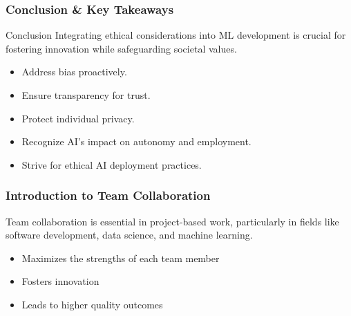 \documentclass[aspectratio=169]{beamer}
\begin{document}
\begin{frame}[fragile]
    \frametitle{Conclusion \& Key Takeaways}
    \begin{block}{Conclusion}
        Integrating ethical considerations into ML development is crucial for fostering innovation while safeguarding societal values.
    \end{block}
    \begin{itemize}
        \item Address bias proactively.
        \item Ensure transparency for trust.
        \item Protect individual privacy.
        \item Recognize AI's impact on autonomy and employment.
        \item Strive for ethical AI deployment practices.
    \end{itemize}
\end{frame}

\begin{frame}[fragile]
    \frametitle{Introduction to Team Collaboration}
    Team collaboration is essential in project-based work, particularly in fields like software development, data science, and machine learning. 
    \begin{itemize}
        \item Maximizes the strengths of each team member
        \item Fosters innovation
        \item Leads to higher quality outcomes
    \end{itemize}
\end{frame}
\end{document}
